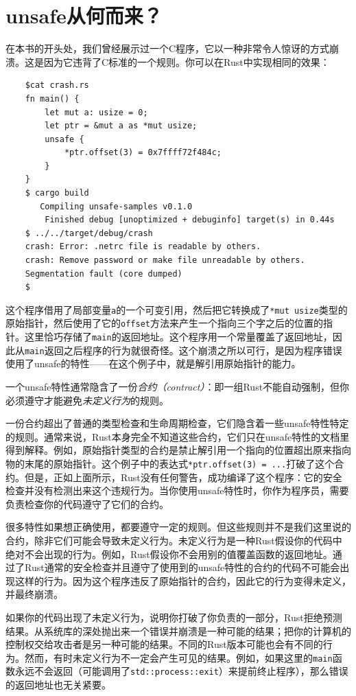 \section{unsafe从何而来？}
在本书的开头处，我们曾经展示过一个C程序，它以一种非常令人惊讶的方式崩溃。这是因为它违背了C标准的一个规则。你可以在Rust中实现相同的效果：

\begin{verbatim}
    $cat crash.rs
    fn main() {
        let mut a: usize = 0;
        let ptr = &mut a as *mut usize;
        unsafe {
            *ptr.offset(3) = 0x7ffff72f484c;
        }
    }
    $ cargo build
       Compiling unsafe-samples v0.1.0
        Finished debug [unoptimized + debuginfo] target(s) in 0.44s
    $ ../../target/debug/crash
    crash: Error: .netrc file is readable by others.
    crash: Remove password or make file unreadable by others.
    Segmentation fault (core dumped)
    $
\end{verbatim}

这个程序借用了局部变量\texttt{a}的一个可变引用，然后把它转换成了\texttt{*mut usize}类型的原始指针，然后使用了它的\texttt{offset}方法来产生一个指向三个字之后的位置的指针。这里恰巧存储了\texttt{main}的返回地址。这个程序用一个常量覆盖了返回地址，因此从\texttt{main}返回之后程序的行为就很奇怪。这个崩溃之所以可行，是因为程序错误使用了unsafe的特性——在这个例子中，就是解引用原始指针的能力。

一个unsafe特性通常隐含了一份\emph{合约（contract）}：即一组Rust不能自动强制，但你必须遵守才能避免\emph{未定义行为}的规则。

一份合约超出了普通的类型检查和生命周期检查，它们隐含着一些unsafe特性特定的规则。通常来说，Rust本身完全不知道这些合约，它们只在unsafe特性的文档里得到解释。例如，原始指针类型的合约是禁止解引用一个指向的位置超出原来指向物的末尾的原始指针。这个例子中的表达式\texttt{*ptr.offset(3) = ...}打破了这个合约。但是，正如上面所示，Rust没有任何警告，成功编译了这个程序：它的安全检查并没有检测出来这个违规行为。当你使用unsafe特性时，你作为程序员，需要负责检查你的代码遵守了它们的合约。

很多特性如果想正确使用，都要遵守一定的规则。但这些规则并不是我们这里说的合约，除非它们可能会导致未定义行为。未定义行为是一种Rust假设你的代码中绝对不会出现的行为。例如，Rust假设你不会用别的值覆盖函数的返回地址。通过了Rust通常的安全检查并且遵守了使用到的unsafe特性的合约的代码不可能会出现这样的行为。因为这个程序违反了原始指针的合约，因此它的行为变得未定义，并最终崩溃。

如果你的代码出现了未定义行为，说明你打破了你负责的一部分，Rust拒绝预测结果。从系统库的深处抛出来一个错误并崩溃是一种可能的结果；把你的计算机的控制权交给攻击者是另一种可能的结果。不同的Rust版本可能也会有不同的行为。然而，有时未定义行为不一定会产生可见的结果。例如，如果这里的\texttt{main}函数永远不会返回（可能调用了\texttt{std::process::exit}）来提前终止程序），那么错误的返回地址也无关紧要。

